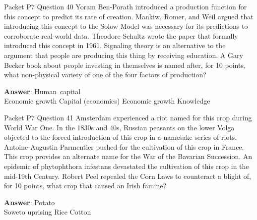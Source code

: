 \begin{frame}{Packet P7 Question 40}
Yoram Ben-Porath introduced a production function for this concept to predict its rate of creation. Mankiw, Romer, and Weil argued that introducing this concept to the Solow Model was   necessary for its predictions to corroborate real-world data. Theodore Schultz wrote the paper that formally introduced this concept in 1961. Signaling theory is an alternative to the argument that people are producing this thing by receiving education. A Gary Becker book about people investing in themselves is named after, for 10 points, what non-physical variety of one of the four factors of production?      

\textbf{Answer}: Human\ capital\\
 Economic growth
 Capital (economics)
 Economic growth
 Knowledge
\end{frame}

\begin{frame}{Packet P7 Question 41}
Amsterdam experienced a riot named for this   crop during World War One. In the 1830s and 40s, Russian peasants on the lower Volga objected to the forced introduction of this crop in a namesake series of riots. Antoine-Augustin Parmentier pushed for the cultivation of this crop in France. This crop provides   an alternate name for the War of the Bavarian Succession.   An epidemic of phytophthora infestans devastated the cultivation of this crop in the mid-19th Century. Robert Peel repealed the Corn Laws to counteract a blight of, for 10 points, what crop that caused an Irish famine?  

\textbf{Answer}: Potato\\
 Soweto uprising
 Rice
 Cotton
\end{frame}

